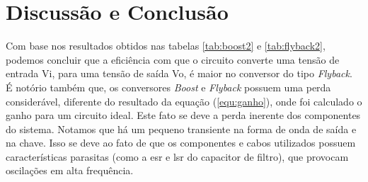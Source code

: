 \newpage
\section{Discussão e Conclusão}
Com base nos resultados obtidos nas tabelas \ref{tab:boost2} e \ref{tab:flyback2}, podemos concluir que a eficiência com que o circuito converte uma tensão de entrada Vi, para uma tensão de saída Vo, é maior no conversor do tipo \textit{Flyback}. É notório também que, os conversores \textit{Boost} e \textit{Flyback} possuem uma perda considerável, diferente do resultado da equação (\ref{equ:ganho}), onde foi calculado o ganho para um circuito ideal. Este fato se deve a perda inerente dos componentes do sistema.
Notamos que há um pequeno transiente na forma de onda de saída e na chave. Isso se deve ao fato de que os componentes e cabos utilizados possuem características parasitas (como a esr e lsr do capacitor de filtro), que provocam oscilações em alta frequência.